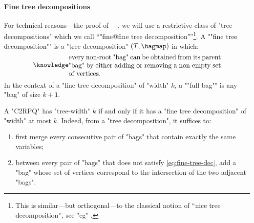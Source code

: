 

\paragraph*{Fine tree decompositions}
    \AP
	For technical reasons---the proof of ---, we will use a restrictive class of "tree decompositions" which we call ``"fine@fine tree decomposition"''\footnote{This is similar---but orthogonal---to the classical notion of
	``nice tree decomposition'', see "eg" \cite[Definition 13.1.4, page 149]{Kloks1994Treewidth}.}. A \AP""fine tree decomposition"" is a "tree decomposition" $(T, \bagmap)$ in which:
	\begin{equation}
		\AP\label{eq:fine-tree-dec}
		\parbox{.65\linewidth}{every non-root "bag" can be obtained from its parent "bag" by
		either adding or removing a non-empty set of vertices.}%
	\end{equation}
	In the context of a "fine tree decomposition" of "width" $k$, a \AP""full bag"" is any "bag" of size $k+1$.
	
    A "C2RPQ" has "tree-width" $k$ if and only if it has a "fine tree decomposition" of "width" at most $k$. Indeed, from a "tree decomposition", it suffices to:
	\begin{enumerate}
		\item first merge every consecutive pair of "bags" that contain exactly the same variables;
		\item between every pair of "bags"
		that does not satisfy \eqref{eq:fine-tree-dec}, add a "bag" whose set of vertices
		correspond to the intersection of the two adjacent "bags".
	\end{enumerate}
    

